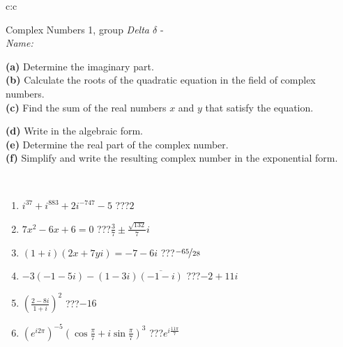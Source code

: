 \documentclass[10pt]{report}
\begin{document}
\begin{tabular}{c:c}
\begin{minipage}[c][104.5mm][t]{0.5\linewidth}
\begin{center}
\vspace{5mm}
{\huge Complex Numbers 1, group \textit{Delta $\delta$} -}\\[5mm]
\textit{Name:}\phantom{xxxxxxxxxxxxxxxxxxxxxxxxxxxxxxxxxxxxxxxxxxxxxxxxxxxxxxxxxxxxxxxxx}\\[5mm]
\begin{minipage}{0.95\linewidth}
\begin{center}
{\small \begin{minipage}{0.44\textwidth} \raggedright
\textbf{(a)} Determine the imaginary part. \\[1mm]
\textbf{(b)} Calculate the roots of the quadratic equation in the field of complex numbers. \\[1mm]
\textbf{(c)} Find the sum of the real numbers \(x\) and \(y\) that satisfy the equation. \end{minipage} \begin{minipage}{0.54\textwidth}
\textbf{(d)} Write in the algebraic form. \\[1mm]
\textbf{(e)} Determine the real part of the complex number. \\[1mm]
\textbf{(f)} Simplify and write the resulting complex number in the exponential form.
\end{minipage}
} \vspace{3mm}
\end{center}
\end{minipage}
\\[1mm]
\begin{minipage}{0.79\linewidth}
\begin{center}
\begin{varwidth}{\linewidth}
\setlength{\itemsep}{0pt}
\begin{enumerate}
\large
\item $i^{37}+i^{883}+2i^{-747}-5$\quad \dotfill\; ???\;\dotfill \quad $2$
\item $7x^2-6x+6=0$\quad \dotfill\; ???\;\dotfill \quad $\frac{3}{7} \pm{}\frac{ \sqrt{132}}{7}i$
\item $(1+i)(2x+7yi)=-7-6i$\quad \dotfill\; ???\;\dotfill \quad $\nicefrac{-65}{28}$
\item $-3(-1-5i)-(1-3i)\overline{(-1-i)}$\quad \dotfill\; ???\;\dotfill \quad $-2+11i$
\item $\left(\frac{2-8i}{1+i}\right)^2$\quad \dotfill\; ???\;\dotfill \quad $-16$
\item $\left(e^{i2\pi}\right)^{-5}\left(\cos{\frac{\pi}{7}}+i\sin{\frac{\pi}{7}}\right)^{3}$\quad \dotfill\; ???\;\dotfill \quad $e^{i\frac{11\pi}{7}}$

\end{enumerate}
\end{varwidth}
\end{center}
\end{minipage}
\end{center}
\end{minipage}
\end{tabular}
\end{document}
